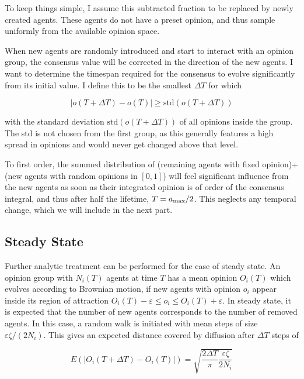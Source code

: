 \documentclass[useAMS,usenatbib]{mn2e}
\begin{document}
To keep things simple, I assume this subtracted fraction to be replaced by newly
created agents. These agents do not have a preset opinion, and thus
sample uniformly from the available opinion space. 

When new agents are randomly introduced and start to interact with an
opinion group, the consensus value will be corrected in the direction
of the new agents. I want to determine the timespan required for the
consensus to evolve significantly from its initial value. I define
this to be the smallest $\Delta T$ for which

\begin{equation}
    |o(T + \Delta T) - o(T)| \geq \text{std}(o(T+\Delta T))
\end{equation}

with the standard deviation $\text{std}(o(T+\Delta T))$ of all opinions inside
the group. The std is not chosen from the first group, as this
generally features a high spread in opinions and would never get
changed above that level.

To first order, the summed distribution of (remaining agents with fixed opinion)+(new
agents with random opinions in $[0,1]$) will 
feel significant influence from the new agents as soon as their
integrated opinion is of order of the consensus integral, and thus
after half the lifetime, $T=a_{\rm max}/2$. This neglects any temporal
change, which we will include in the next part.

\subsection{Steady State}

Further analytic treatment can be performed for the case of steady state. An
opinion group with $N_i(T)$ agents at time $T$ has a mean
opinion $O_i(T)$ which evolves according to Brownian motion, if new agents
with opinion $o_i$ appear inside its region of attraction $O_i(T)-\varepsilon \leq o_i
\leq O_i(T)+\varepsilon$. In steady state, it is expected that the
number of new agents corresponds to the number of removed agents. In
this case, a random walk is initiated with mean
steps of size $\varepsilon \zeta /(2 N_i)$. This gives an expected distance
covered by diffusion after $\Delta T$ steps of

\begin{equation}
    E(|O_i(T+\Delta T)-O_i(T)|) = \sqrt{\frac{2\Delta T}{\pi}\frac{\varepsilon \zeta}{2 N_i}}
\end{equation}
\end{document}

